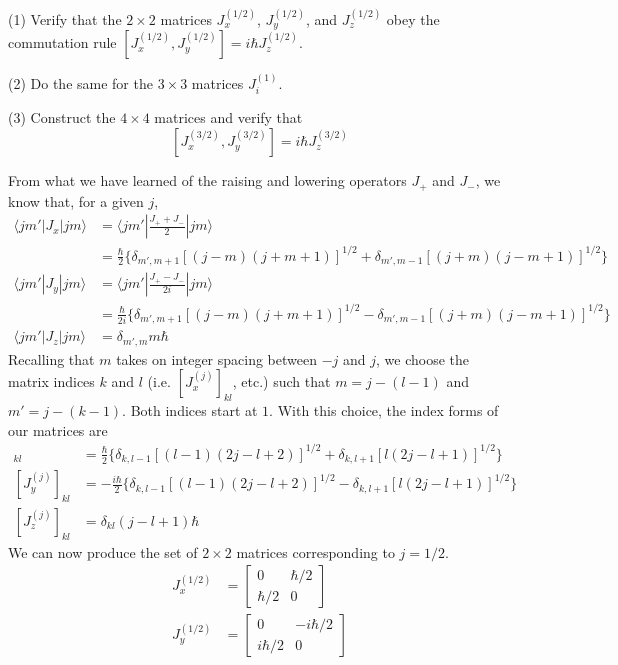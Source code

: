 \documentclass[../principles-of-quantum-mechanics.tex]{subfiles}
\begin{document}
\begin{questions}
		\question (1) Verify that the $2\times2$ matrices $J_x^{(1/2)}$, $J_y^{(1/2)}$, and $J_z^{(1/2)}$ obey the commutation rule $[J_x^{(1/2)}, J_y^{(1/2)}] = i\hbar J_z^{(1/2)}$.
		
		(2) Do the same for the $3\times3$ matrices $J_i^{(1)}$.
		
		(3) Construct the $4\times4$ matrices and verify that
		$$[J_x^{(3/2)}, J_y^{(3/2)}] = i\hbar J_z^{(3/2)}$$
		
		\begin{solution}
			From what we have learned of the raising and lowering operators $J_+$ and $J_-$, we know that, for a given $j$, 
			\begin{align*}
				\langle jm'|J_x|jm\rangle &= \langle jm'|\frac{J_+ + J_-}{2}|jm\rangle \\
				&= \frac{\hbar}{2}\{\delta_{m',m+1}[(j-m)(j+m+1)]^{1/2} + \delta_{m',m-1}[(j+m)(j-m+1)]^{1/2}\} \\
				\langle jm'|J_y|jm\rangle &= \langle jm'|\frac{J_+ - J_-}{2i}|jm\rangle \\
				&= \frac{\hbar}{2i}\{\delta_{m',m+1}[(j-m)(j+m+1)]^{1/2} - \delta_{m',m-1}[(j+m)(j-m+1)]^{1/2}\} \\
				\langle jm'|J_z|jm\rangle &= \delta_{m', m}m\hbar
			\end{align*}
			Recalling that $m$ takes on integer spacing between $-j$ and $j$, we choose the matrix indices $k$ and $l$ (i.e. $[J_x^{(j)}]_{kl}$, etc.) such that $m = j - (l - 1)$ and $m' = j - (k - 1)$. Both indices start at $1$. With this choice, the index forms of our matrices are
			\begin{align*}
				[J_x^{(j)}]_{kl} &= \frac{\hbar}{2}\{\delta_{k, l - 1}[(l - 1)(2j - l + 2)]^{1/2} + \delta_{k, l + 1}[l(2j - l + 1)]^{1/2}\} \\
				[J_y^{(j)}]_{kl} &= -\frac{i\hbar}{2}\{\delta_{k, l - 1}[(l - 1)(2j - l + 2)]^{1/2} - \delta_{k, l + 1}[l(2j - l + 1)]^{1/2}\} \\
				[J_z^{(j)}]_{kl} &= \delta_{kl}(j - l + 1)\hbar
			\end{align*}
			We can now produce the set of $2\times2$ matrices corresponding to $j = 1/2$.
			\begin{align*}
				J_x^{(1/2)} &= \begin{bmatrix}0 & \hbar/2 \\ \hbar/2 & 0 \end{bmatrix} \\
				J_y^{(1/2)} &= \begin{bmatrix} 0 & -i\hbar/2 \\ i\hbar/2 & 0\end{bmatrix} \\

\end{align*}
\end{solution}
\end{questions}
\end{document}
